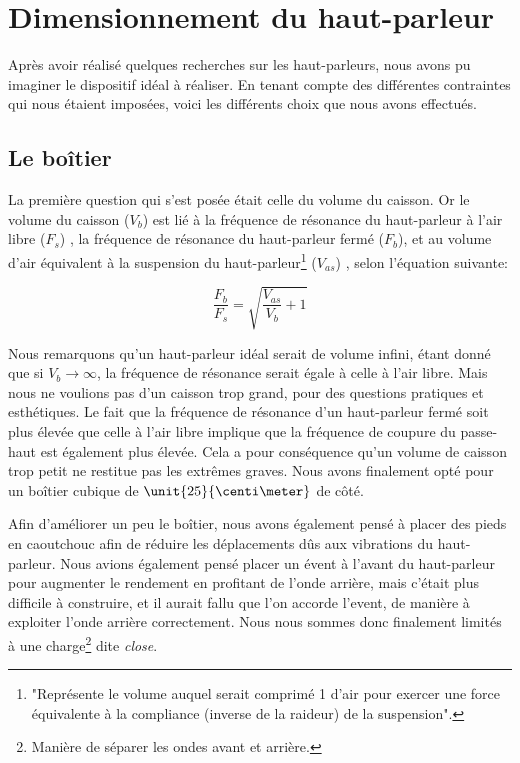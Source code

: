 



\section{Dimensionnement du haut-parleur}

Après avoir réalisé quelques recherches sur les haut-parleurs, nous avons pu imaginer le dispositif idéal
à réaliser. En tenant compte des différentes contraintes qui nous étaient imposées, voici les différents
choix que nous avons effectués.

\subsection{Le boîtier}
La première question qui s'est posée était celle du volume du caisson. Or le volume du caisson ($V_b$) est
lié à la fréquence de résonance du
haut-parleur à l'air libre ($F_s$) , la fréquence de résonance du haut-parleur fermé ($F_b$), et au volume
d'air équivalent à la suspension du haut-parleur\footnote{"Représente le volume auquel serait comprimé
\unit{1}{\meter\cubed} d'air pour exercer une force équivalente à la compliance (inverse de la raideur) de la suspension"\cite{Vas}.}
($V_{as}$) , selon l'équation suivante\cite{Vas}:

$$\frac{F_b}{F_s} = \sqrt{\frac{V_{as}}{V_b} + 1}$$

Nous remarquons qu'un haut-parleur idéal serait de volume infini, étant donné que si $V_b\rightarrow \infty$, la fréquence de résonance serait égale à celle à l'air libre. Mais nous ne voulions pas d'un caisson trop grand, pour des questions pratiques et esthétiques.
Le fait que la fréquence de résonance d'un haut-parleur fermé soit plus élevée que celle à l'air libre implique que
la fréquence de coupure du passe-haut est également plus élevée. Cela a pour conséquence
qu'un volume de caisson trop petit ne restitue pas les extrêmes graves. Nous avons finalement opté pour un boîtier
cubique de $\unit{25}{\centi\meter}$ de côté.

Afin d'améliorer un peu le boîtier, nous avons également pensé à placer des pieds en caoutchouc afin de
réduire les déplacements dûs aux vibrations du haut-parleur. Nous avions également pensé placer un évent à l'avant du haut-parleur
pour augmenter le rendement en profitant de l'onde arrière, mais c'était plus difficile à construire, et
il aurait fallu que l'on accorde l'event, de manière à exploiter l'onde arrière correctement. Nous nous
sommes donc finalement limités à une charge\footnote{Manière de séparer les ondes avant et arrière.} dite
\textit{close}\cite{close}.

